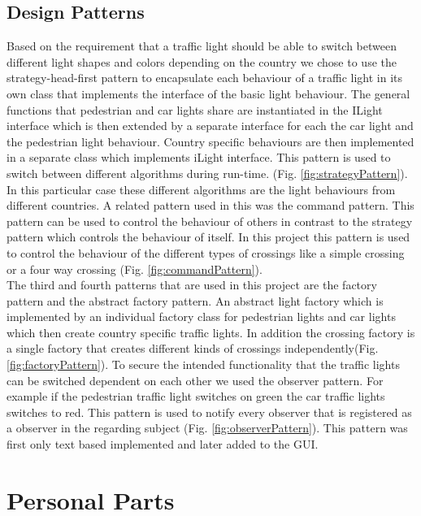 \documentclass{report}
\begin{document}
    \section{Design Patterns}
    Based on the requirement that a traffic light should be able to switch between different light shapes and colors depending on the country we chose to use the strategy-head-first pattern to encapsulate each behaviour of a traffic light in its own class that implements the interface of the basic light behaviour. The general functions that pedestrian and car lights share are instantiated in the ILight interface which is then extended by a separate interface for each the car light and the pedestrian light behaviour. Country specific behaviours are then implemented in a separate class which implements iLight interface. This pattern is used to switch between different algorithms during run-time. (Fig. \ref{fig:strategyPattern}).\\
    In this particular case these different algorithms are the light behaviours from different countries. A related pattern used in this was the command pattern. This pattern can be used to control the behaviour of others in contrast to the strategy pattern which controls the behaviour of itself. In this project this pattern is used to control the behaviour of the different types of crossings like a simple crossing or a four way crossing (Fig. \ref{fig:commandPattern}).\\
    The third and fourth patterns that are used in this project are the factory pattern and the abstract factory pattern. An abstract light factory which is implemented by an individual factory class for pedestrian lights and car lights which then create country specific traffic lights. In addition the crossing factory is a single factory that creates different kinds of crossings independently(Fig. \ref{fig:factoryPattern}).
    To secure the intended functionality that the traffic lights can be switched dependent on each other we used the observer pattern. For example if the pedestrian traffic light switches on green the car traffic lights switches to red. This pattern is used to notify every observer that is registered as a observer in the regarding subject (Fig. \ref{fig:observerPattern}). This pattern was first only text based implemented and later added to the GUI.

    \chapter{Personal Parts}
\end{document}
